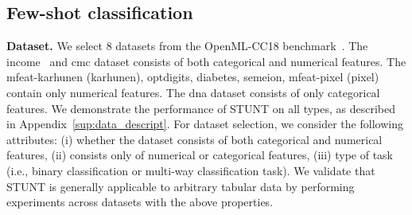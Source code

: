 \subsection{Few-shot classification}
\label{sec:few_shot_cls}

\textbf{Dataset.}
We select 8 datasets from the OpenML-CC18 benchmark~\citep{bishcl2018openml, asuncion2007uci}. The income~\citep{kohavi1996scaling} and cmc dataset consists of both categorical and numerical features. The mfeat-karhunen (karhunen), optdigits, diabetes, semeion, mfeat-pixel (pixel) contain only numerical features. The dna dataset consists of only categorical features. We demonstrate the performance of STUNT on all types, as described in {Appendix~\ref{sup:data_descript}. } For dataset selection, we consider the following attributes: (i) whether the dataset consists of both categorical and numerical features, (ii) consists only of numerical or categorical features, (iii) type of task (i.e., binary classification or multi-way classification task). We validate that STUNT is generally applicable to arbitrary tabular data by performing experiments across datasets with the above properties.

